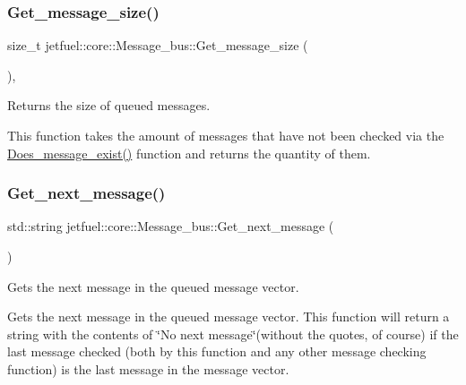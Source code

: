 \subsubsection{\texorpdfstring{Get\+\_\+message\+\_\+size()}{Get\_message\_size()}}
{\footnotesize\ttfamily size\+\_\+t jetfuel\+::core\+::\+Message\+\_\+bus\+::\+Get\+\_\+message\+\_\+size (\begin{DoxyParamCaption}{ }\end{DoxyParamCaption})\hspace{0.3cm}{\ttfamily [inline]}, {\ttfamily [protected]}}



Returns the size of queued messages. 

This function takes the amount of messages that have not been checked via the \hyperlink{classjetfuel_1_1core_1_1Message__bus_a9bbbbea3cd97a8f8253e08b700dbd05d}{Does\+\_\+message\+\_\+exist()} function and returns the quantity of them. \mbox{\label{classjetfuel_1_1core_1_1Message__bus_ae79fcd8945a1d72bbebc838be6d23a1f}} 
\subsubsection{\texorpdfstring{Get\+\_\+next\+\_\+message()}{Get\_next\_message()}}
{\footnotesize\ttfamily std\+::string jetfuel\+::core\+::\+Message\+\_\+bus\+::\+Get\+\_\+next\+\_\+message (\begin{DoxyParamCaption}{ }\end{DoxyParamCaption})}



Gets the next message in the queued message vector. 

Gets the next message in the queued message vector. This function will return a string with the contents of \char`\"{}\+No next message\char`\"{}(without the quotes, of course) if the last message checked (both by this function and any other message checking function) is the last message in the message vector. \mbox{\label{classjetfuel_1_1core_1_1Message__bus_ab80c8b51aca00ad4942ee2114fdf2fec}} 
